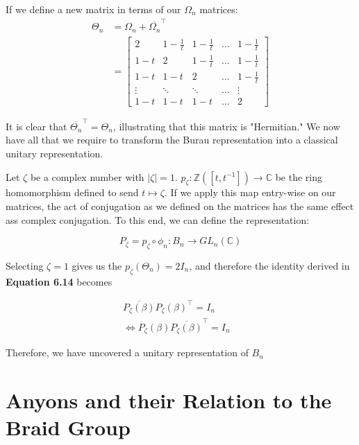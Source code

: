 \documentclass[10pt]{ucthesis}
\newcommand{\Z}{\mathbb{Z}}
\newcommand{\C}{\mathbb{C}}
\begin{document}
If we define a new matrix in terms of our $\Omega_n$ matrices:
\begin{equation}
	\begin{aligned}
		\Theta_n &= \Omega_n + \overline{\Omega_n}^\intercal \\
					&=  \begin{bmatrix}
						2 & 1-\frac{1}{t} & 1-\frac{1}{t} &\hdots & 1-\frac{1}{t} \\
						1-t & 2 & 1-\frac{1}{t} & \hdots & 1-\frac{1}{t} \\
						1-t & 1-t & 2 & \hdots & 1-\frac{1}{t} \\
						\vdots&\ddots&\ddots&\hdots&\vdots\\
						1-t & 1-t & 1-t & \hdots & 2
					\end{bmatrix}
	\end{aligned}
\end{equation}

It is clear that $\overline{\Theta_n}^\intercal = \Theta_n$, illustrating that this matrix is "Hermitian." We now have all that we require to transform the Burau representation into a classical unitary representation.

Let $\zeta$ be a complex number with $|\zeta|=1$. $p_\zeta:\Z([t,t^{-1}]) \rightarrow \C$ be the ring homomorphism defined to send $t\mapsto\zeta$. If we apply this map entry-wise on our matrices, the act of conjugation as we defined on the matrices has the same effect ass complex conjugation. To this end, we can define the representation:

$$P_\zeta = p_\zeta\circ\phi_n: B_n\rightarrow GL_n(\C)$$

Selecting $\zeta=1$ gives us the $p_\zeta(\Theta_n) = 2I_n$, and therefore the identity derived in \textbf{Equation 6.14} becomes

\begin{equation}
	\begin{aligned}
		\overline{P_\zeta(\beta)}P_\zeta(\beta)^\intercal = I_n &\\
		\Leftrightarrow P_\zeta(\beta)\overline{P_\zeta(\beta)}^\intercal  = I_n
	\end{aligned}
\end{equation}

Therefore, we have uncovered a unitary representation of $B_n$

\section{Anyons and their Relation to the Braid Group}
\end{document}
